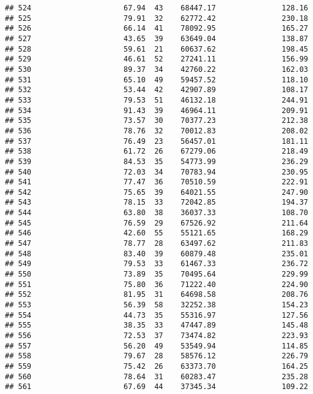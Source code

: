 \documentclass[
]{article}
\begin{document}
\begin{verbatim}
## 524                     67.94  43    68447.17               128.16
## 525                     79.91  32    62772.42               230.18
## 526                     66.14  41    78092.95               165.27
## 527                     43.65  39    63649.04               138.87
## 528                     59.61  21    60637.62               198.45
## 529                     46.61  52    27241.11               156.99
## 530                     89.37  34    42760.22               162.03
## 531                     65.10  49    59457.52               118.10
## 532                     53.44  42    42907.89               108.17
## 533                     79.53  51    46132.18               244.91
## 534                     91.43  39    46964.11               209.91
## 535                     73.57  30    70377.23               212.38
## 536                     78.76  32    70012.83               208.02
## 537                     76.49  23    56457.01               181.11
## 538                     61.72  26    67279.06               218.49
## 539                     84.53  35    54773.99               236.29
## 540                     72.03  34    70783.94               230.95
## 541                     77.47  36    70510.59               222.91
## 542                     75.65  39    64021.55               247.90
## 543                     78.15  33    72042.85               194.37
## 544                     63.80  38    36037.33               108.70
## 545                     76.59  29    67526.92               211.64
## 546                     42.60  55    55121.65               168.29
## 547                     78.77  28    63497.62               211.83
## 548                     83.40  39    60879.48               235.01
## 549                     79.53  33    61467.33               236.72
## 550                     73.89  35    70495.64               229.99
## 551                     75.80  36    71222.40               224.90
## 552                     81.95  31    64698.58               208.76
## 553                     56.39  58    32252.38               154.23
## 554                     44.73  35    55316.97               127.56
## 555                     38.35  33    47447.89               145.48
## 556                     72.53  37    73474.82               223.93
## 557                     56.20  49    53549.94               114.85
## 558                     79.67  28    58576.12               226.79
## 559                     75.42  26    63373.70               164.25
## 560                     78.64  31    60283.47               235.28
## 561                     67.69  44    37345.34               109.22

\end{verbatim}
\end{document}
